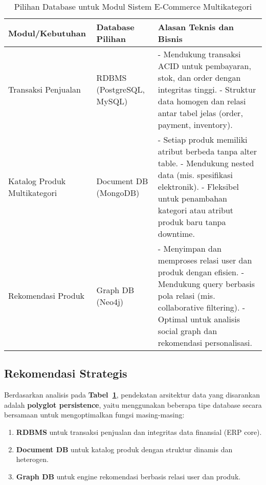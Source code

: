 \begin{table}[h]
	\centering
	\renewcommand{\arraystretch}{1.3}
	\caption{Pilihan Database untuk Modul Sistem E-Commerce Multikategori}
	\label{tab:db_choice_analysis}
	\begin{tabular}{|
			p{}|
			p{}|
			>{\raggedright\arraybackslash}p{}|
		}
		\hline
		\textbf{Modul/Kebutuhan} & \textbf{Database Pilihan} & \textbf{Alasan Teknis dan Bisnis} \\
		\hline
		Transaksi Penjualan & RDBMS (PostgreSQL, MySQL) &
		- Mendukung transaksi ACID untuk pembayaran, stok, dan order dengan integritas tinggi. \newline
		- Struktur data homogen dan relasi antar tabel jelas (order, payment, inventory). \\
		\hline
		Katalog Produk Multikategori & Document DB (MongoDB) &
		- Setiap produk memiliki atribut berbeda tanpa alter table. \newline
		- Mendukung nested data (mis. spesifikasi elektronik). \newline
		- Fleksibel untuk penambahan kategori atau atribut produk baru tanpa downtime. \\
		\hline
		Rekomendasi Produk & Graph DB (Neo4j) &
		- Menyimpan dan memproses relasi user dan produk dengan efisien. \newline
		- Mendukung query berbasis pola relasi (mis. collaborative filtering). \newline
		- Optimal untuk analisis social graph dan rekomendasi personalisasi. \\
		\hline
	\end{tabular}
\end{table}


\subsection{Rekomendasi Strategis}

Berdasarkan analisis pada \textbf{Tabel~\ref{tab:db_choice_analysis}}, pendekatan arsitektur data yang disarankan adalah \textbf{polyglot persistence}, yaitu menggunakan beberapa tipe database secara bersamaan untuk mengoptimalkan fungsi masing-masing:

\begin{enumerate}
	\item \textbf{RDBMS} untuk transaksi penjualan dan integritas data finansial (ERP core).
	\item \textbf{Document DB} untuk katalog produk dengan struktur dinamis dan heterogen.
	\item \textbf{Graph DB} untuk engine rekomendasi berbasis relasi user dan produk.
\end{enumerate}

